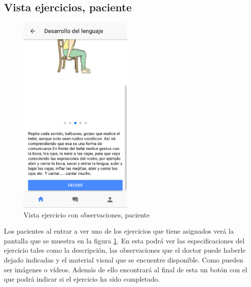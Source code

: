 \subsection{Vista ejercicios, paciente}
\begin{figure}[!h]
    \centering
    \includegraphics[width=0.5\textwidth]{images/screenshots/Paciente-vista-ejercicio-con-observaciones.png}
    \caption{Vista ejercicio con observaciones, paciente}
    \label{ejercicio-con-observaciones}
\end{figure}

Los pacientes al entrar a ver uno de los ejercicios que tiene asignados verá
la pantalla que se muestra en la figura \ref{ejercicio-con-observaciones}. En
esta podrá ver las especificaciones del ejercicio tales como la descripción,
las observaciones que el doctor puede haberle dejado indicadas y el material
visual que se encuentre disponible. Como pueden ser imágenes o vídeos. Además de
ello encontrará al final de esta un botón con el que podrá indicar si el
ejercicio ha sido completado.
\clearpage

